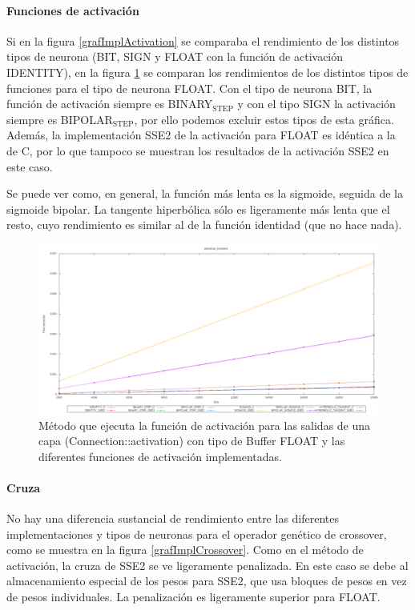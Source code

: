 \documentclass[11pt]{article}
\begin{document}
\begin{titlepage}
\paragraph{Funciones de activación}
\label{sec-6-1-1-3}


Si en la figura \ref{grafImplActivation} se comparaba el rendimiento de los distintos tipos de neurona (BIT, SIGN y FLOAT con la función de activación IDENTITY), en la figura \ref{grafImplActivationFunc} se comparan los rendimientos de los distintos tipos de funciones para el tipo de neurona FLOAT. Con el tipo de neurona BIT, la función de activación siempre es BINARY$_{\mathrm{STEP}}$ y con el tipo SIGN la activación siempre es BIPOLAR$_{\mathrm{STEP}}$, por ello podemos excluir estos tipos de esta gráfica. Además, la implementación SSE2 de la activación para FLOAT es idéntica a la de C, por lo que tampoco se muestran los resultados de la activación SSE2 en este caso.

Se puede ver como, en general, la función más lenta es la sigmoide, seguida de la sigmoide bipolar. La tangente hiperbólica sólo es ligeramente más lenta que el resto, cuyo rendimiento es similar al de la función identidad (que no hace nada).

\begin{figure}[htb]
\centering
\includegraphics[width=\textwidth]{./img/Activation_functions.png}
\caption{\label{grafImplActivationFunc}Método que ejecuta la función de activación para las salidas de una capa (Connection::activation) con tipo de Buffer FLOAT y las diferentes funciones de activación implementadas.}
\end{figure}
\newpage
\paragraph{Cruza}
\label{sec-6-1-1-4}


No hay una diferencia sustancial de rendimiento entre las diferentes implementaciones y tipos de neuronas para el operador genético de crossover, como se muestra en la figura \ref{grafImplCrossover}. Como en el método de activación, la cruza de SSE2 se ve ligeramente penalizada. En este caso se debe al almacenamiento especial de los pesos para SSE2, que usa bloques de pesos en vez de pesos individuales. La penalización es ligeramente superior para FLOAT.


\end{titlepage}
\end{document}
